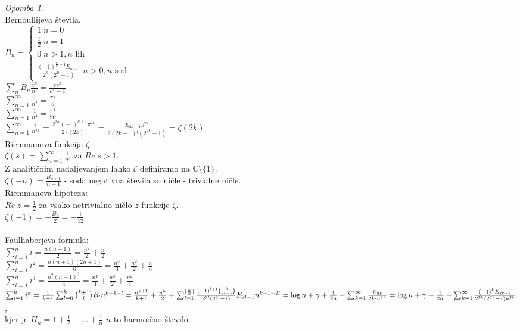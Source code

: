 \documentclass[a4paper, 12pt]{book}
\theoremstyle{definition}
\theoremstyle{remark}
\newtheorem*{rem}{Opomba}
\newcommand{\C}{\mathbb{C}}
\begin{document}
\begin{rem} \text{} \\
  Bernoullijeva števila. \\
  $B_n = \begin{cases}
    1 \; n = 0 \\
    \frac{1}{2} \; n = 1 \\
    0 \; n > 1, n \text{ lih} \\
    \frac{(-1)^{\frac{n}{2} + 1} E_{n-1}}{2^n (2^n - 1)} \; n > 0, n \text{ sod}
  \end{cases}$ \\
  $\sum_n B_n \frac{x^n}{n!} = \frac{x e^x}{e^x - 1}$ \\
  $\sum_{n=1}^{\infty} \frac{1}{n^2} = \frac{\pi^2}{6}$ \\
  $\sum_{n=1}^{\infty} \frac{1}{n^4} = \frac{\pi^4}{90}$ \\
  $\sum_{n=1}^{\infty} \frac{1}{n^{2k}} = \frac{2^{2n} (-1)^{k+1} \pi^{2k}}{2 \cdot (2k)!}
  = \frac{E_{2k-1} \pi^{2k}}{2 (2k-1)! (2^{2k}-1)} = \zeta(2k)$ \\
  Riemmanova funkcija $\zeta$: \\
  $\zeta(s) = \sum_{n=1}^{\infty} \frac{1}{n^s}$ za $Re \; s > 1$. \\
  Z analitičnim nadaljevanjem lahko $\zeta$ definiramo na $\C \setminus \{1\}$. \\
  $\zeta(-n) = \frac{B_{n+1}}{n+1}$ - soda negativna števila so ničle - trivialne ničle. \\
  Riemmanova hipoteza: \\
  $Re \; z = \frac{1}{2}$ za vsako netrivialno ničlo $z$ funkcije $\zeta$. \\
  $\zeta(-1) = -\frac{B_2}{2} = -\frac{1}{12}$ \\
   \\
  Faulhaberjeva formula: \\
  $\sum_{i=1}^{n} i = \frac{n (n+1)}{2} = \frac{n^2}{2} + \frac{n}{2}$ \\
  $\sum_{i=1}^{n} i^2 = \frac{n (n+1) (2n+1)}{6} = \frac{n^3}{3} + \frac{n^2}{2} + \frac{n}{6}$ \\
  $\sum_{i=1}^{n} i^3 = \frac{n^2 (n+1)^2}{4} = \frac{n^4}{4} + \frac{n^3}{2} + \frac{n^2}{4}$ \\
  $\sum_{i=1}^{n} i^k = \frac{1}{k+1} \sum_{l=0}^{k} \binom{k+1}{l} B_l n^{k+1-l} \\
  = \frac{n^{k+1}}{k+1} + \frac{n^k}{2} + \sum_{l=1}^{\lfloor\frac{k}{2}\rfloor}
  \frac{(-1)^{l+1} \binom{k}{2l-1}}{2^{2l} (2^{2l}-1)} E_{2l-1} n^{k-1-2l} \\
  = \log n + \gamma + \frac{1}{2n} - \sum_{k=1}^{\infty} \frac{B_{2k}}{2k \cdot n^{2k}} \\
  = \log n + \gamma + \frac{1}{2n} - \sum_{k=1}^{\infty} \frac{(-1)^k E_{2k-1}}{2^{2k} (2^{2k} - 1) n^{2k}}$, \\
  kjer je $H_n = 1 + \frac{1}{2} + \dots + \frac{1}{n}$ $n$-to harmoično število.
\end{rem}
\end{document}
